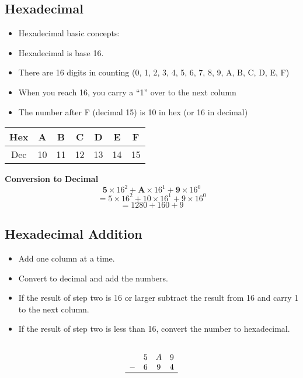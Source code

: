 \documentclass[a4paper,12pt]{article}
\begin{document}
\subsection*{Hexadecimal}
\begin{itemize}
\item Hexadecimal basic concepts:	
\item Hexadecimal is base 16.  
\item There are 16 digits in counting (0, 1, 2, 3, 4, 5, 6, 7, 8, 9, A, B, C, D, E, F)
\item When you reach 16, you carry a “1” over to the next column
\item The number after F (decimal 15) is 10 in hex (or 16 in decimal)
\end{itemize}

\begin{tabular}{|c||c|c|c|c|c|c|}
\hline Hex & A & B  & C & D & E & F \\  \hline
\hline Dec & 10 & 11 & 12 & 13  &14  &15  \\  \hline
\hline 
\end{tabular} 

\textbf{Conversion to Decimal}
\[\textbf{5} \times 16^2 + \textbf{A} \times 16^1  + \textbf{9} \times 16^0\]
\[=5 \times 16^2 + 10 \times 16^1  + 9 \times 16^0\]
\[= 1280 + 160 + 9\]



\subsection*{Hexadecimal Addition}
\begin{itemize}
\item		Add one column at a time.

\item		Convert to decimal and add the numbers.

\item	If the result of step two is 16 or larger subtract the result from 16 and carry 1 to the next column.

\item	If the result of step two is less than 16, convert the number to hexadecimal.

\end{itemize}

\[\begin{array}{cccc}
	&		&		&		\\	
	&	5	&	A	&	9	\\	
	-&	6	&	9	&	4	\\	\hline
	&		&		&		\\	
\end{array}\]
\end{document}
